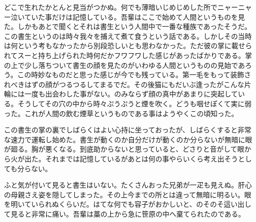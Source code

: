 \documentclass[]{ltjtbook}
\begin{document}
どこで生れたかとんと見当がつかぬ。何でも薄暗いじめじめした所でニャーニャー泣いていた事だけは記憶している。吾輩はここで始めて人間というものを見た。しかもあとで聞くとそれは書生という人間中で一番な種族であったそうだ。この書生というのは時々我々を捕えて煮て食うという話である。しかしその当時は何という考もなかったから別段恐しいとも思わなかった。ただ彼の掌に載せられてスーと持ち上げられた時何だかフワフワした感じがあったばかりである。掌の上で少し落ちついて書生の顔を見たのがいわゆる人間というものの見始であろう。この時妙なものだと思った感じが今でも残っている。第一毛をもって装飾されべきはずの顔がつるつるしてまるでだ。その後猫にもだいぶ逢ったがこんな片輪には一度も出会わした事がない。のみならず顔の真中があまりに突起している。そうしてその穴の中から時々ぷうぷうと煙を吹く。どうも咽せぽくて実に弱った。これが人間の飲む煙草というものである事はようやくこの頃知った。

この書生の掌の裏でしばらくはよい心持に坐っておったが、しばらくすると非常な速力で運転し始めた。書生が動くのか自分だけが動くのか分らないが無暗に眼が廻る。胸が悪くなる。到底助からないと思っていると、どさりと音がして眼から火が出た。それまでは記憶しているがあとは何の事やらいくら考え出そうとしても分らない。

ふと気が付いて見ると書生はいない。たくさんおった兄弟が一疋も見えぬ。肝心の母親さえ姿を隠してしまった。その上今までの所とは違って無暗に明るい。眼を明いていられぬくらいだ。はてな何でも容子がおかしいと、のそのそ這い出して見ると非常に痛い。吾輩は藁の上から急に笹原の中へ棄てられたのである。
\end{document}
